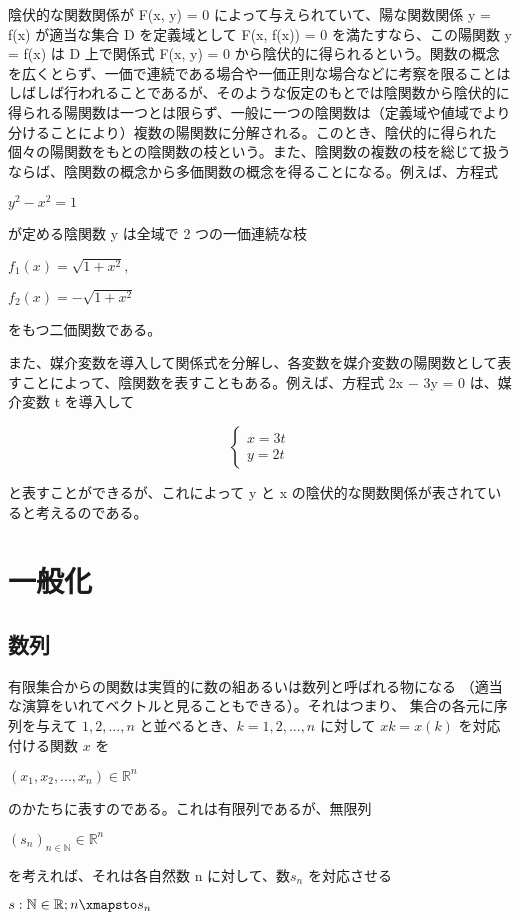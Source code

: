 \documentclass[a4j,12pt]{jreport}
\begin{document}
陰伏的な関数関係が F(x, y) = 0 によって与えられていて、陽な関数関係 y = f(x) が適当な集合 D を定義域として F(x, f(x)) = 0 を満たすなら、この陽関数 y = f(x) は D 上で関係式 F(x, y) = 0 から陰伏的に得られるという。関数の概念を広くとらず、一価で連続である場合や一価正則な場合などに考察を限ることはしばしば行われることであるが、そのような仮定のもとでは陰関数から陰伏的に得られる陽関数は一つとは限らず、一般に一つの陰関数は（定義域や値域でより分けることにより）複数の陽関数に分解される。このとき、陰伏的に得られた個々の陽関数をもとの陰関数の枝という。また、陰関数の複数の枝を総じて扱うならば、陰関数の概念から多価関数の概念を得ることになる。例えば、方程式

$y^2 - x^2 = 1$

が定める陰関数 y は全域で 2 つの一価連続な枝

$f_1(x)=\sqrt{1 + x^2} ,$

$f_2(x)=- \sqrt{1 + x^2}$

をもつ二価関数である。

また、媒介変数を導入して関係式を分解し、各変数を媒介変数の陽関数として表すことによって、陰関数を表すこともある。例えば、方程式 2x − 3y = 0 は、媒介変数 t を導入して

$$
\begin{cases}
x = 3t\\
y = 2t
\end{cases}
$$

と表すことができるが、これによって y と x の陰伏的な関数関係が表されていると考えるのである。


\section{一般化}
\subsection{数列}
有限集合からの関数は実質的に数の組あるいは数列と呼ばれる物になる
（適当な演算をいれてベクトルと見ることもできる）。それはつまり、
集合の各元に序列を与えて ${1, 2, ..., n}$ と並べるとき、$k = 1, 2, ..., n$ に対して $xk = x(k)$ を対応付ける関数 $x$ を

$(x_1,x_2,...,x_n) \in \mathbb{R}^n$

のかたちに表すのである。これは有限列であるが、無限列

$(s_n)_{n\in \mathbb{N}} \in \mathbb{R}^n$

を考えれば、それは各自然数 n に対して、数$s_n$ を対応させる

$s: \mathbb{N} \in \mathbb{R}; n \xmapsto s_n$
\end{document}

